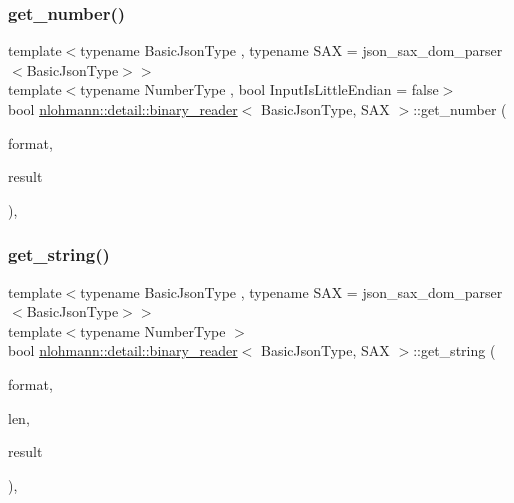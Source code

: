 \subsubsection{\texorpdfstring{get\+\_\+number()}{get\_number()}}
{\footnotesize\ttfamily template$<$typename Basic\+Json\+Type , typename S\+AX  = json\+\_\+sax\+\_\+dom\+\_\+parser$<$\+Basic\+Json\+Type$>$$>$ \\
template$<$typename Number\+Type , bool Input\+Is\+Little\+Endian = false$>$ \\
bool \hyperlink{classnlohmann_1_1detail_1_1binary__reader}{nlohmann\+::detail\+::binary\+\_\+reader}$<$ Basic\+Json\+Type, S\+AX $>$\+::get\+\_\+number (\begin{DoxyParamCaption}\item[{const \hyperlink{namespacenlohmann_1_1detail_aa554fc6a11519e4f347deb25a9f0db40}{input\+\_\+format\+\_\+t}}]{format,  }\item[{Number\+Type \&}]{result }\end{DoxyParamCaption})\hspace{0.3cm}{\ttfamily [inline]}, {\ttfamily [private]}}

\mbox{\label{classnlohmann_1_1detail_1_1binary__reader_a1f4b5da029a561c8711426b0a7316ec6}} 
\subsubsection{\texorpdfstring{get\+\_\+string()}{get\_string()}}
{\footnotesize\ttfamily template$<$typename Basic\+Json\+Type , typename S\+AX  = json\+\_\+sax\+\_\+dom\+\_\+parser$<$\+Basic\+Json\+Type$>$$>$ \\
template$<$typename Number\+Type $>$ \\
bool \hyperlink{classnlohmann_1_1detail_1_1binary__reader}{nlohmann\+::detail\+::binary\+\_\+reader}$<$ Basic\+Json\+Type, S\+AX $>$\+::get\+\_\+string (\begin{DoxyParamCaption}\item[{const \hyperlink{namespacenlohmann_1_1detail_aa554fc6a11519e4f347deb25a9f0db40}{input\+\_\+format\+\_\+t}}]{format,  }\item[{const Number\+Type}]{len,  }\item[{\hyperlink{classnlohmann_1_1detail_1_1binary__reader_aa0b9729917ca7ee6ed01e3792341316e}{string\+\_\+t} \&}]{result }\end{DoxyParamCaption})\hspace{0.3cm}{\ttfamily [inline]}, {\ttfamily [private]}}



